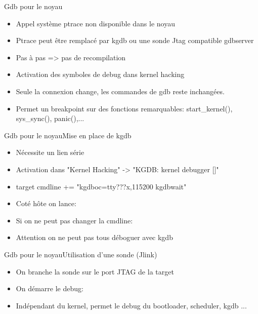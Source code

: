 \begin{frame}{Gdb pour le noyau}
	\begin{itemize}
		\item
			Appel système ptrace non disponible dans le noyau
		\item
			Ptrace peut être remplacé par kgdb ou une sonde Jtag compatible gdbserver
		\item
			Pas à pas => pas de recompilation
		\item
			Activation des symboles de debug dans kernel hacking
		\item
			Seule la connexion change, les commandes de gdb reste inchangées.
		\item
			Permet un breakpoint sur des fonctions remarquables: start\_kernel(), sys\_sync(), panic(),...
	\end{itemize}
\end{frame}

\begin{frame}{Gdb pour le noyau}{Mise en place de kgdb}
	\begin{itemize}
		\item
			Nécessite un lien série
		\item
			Activation dans "Kernel Hacking" -> "KGDB: kernel debugger []"
		\item
			target cmdline += "kgdboc=tty???x,115200 kgdbwait"
		\item
			Coté hôte on lance:
			\kgdb
		\item
			Si on ne peut pas changer la cmdline:
			\sysrq
		\item
			Attention on ne peut pas tous déboguer avec kgdb
	\end{itemize}
\end{frame}

\begin{frame}{Gdb pour le noyau}{Utilisation d'une sonde (Jlink)}
	\begin{itemize}
		\item
			On branche la sonde sur le port JTAG de la target
		\item
			On démarre le debug:
			\jlink
		\item
			Indépendant du kernel, permet le debug du bootloader, scheduler, kgdb ...
	\end{itemize}
\end{frame}

